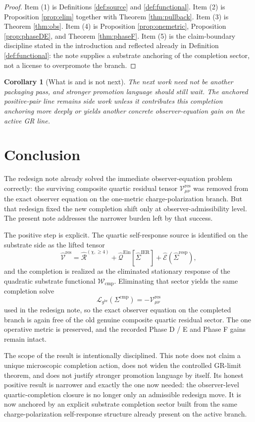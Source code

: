 \documentclass[11pt]{article}
\newcommand{\ObserverMetric}{g^{\mathrm{br}}}
\newcommand{\CompShift}{\Sigma^{\mathrm{cmp}}}
\newcommand{\BaseLift}{\widehat\Sigma^{\mathrm{IER}}}
\newcommand{\ResponseLift}{\widehat\Sigma^{\mathrm{resp}}}
\newcommand{\ResidualCore}{\mathcal V_{\mu\nu}^{\mathrm{res}}}
\newcommand{\ResidualLift}{\widehat{\mathcal V}^{\mathrm{res}}}
\newcommand{\CompFunctional}{\mathcal W_{\mathrm{cmp}}}
\newcommand{\ReducedEin}{\mathcal L_{\ObserverMetric}}
\newtheorem{corollary}{Corollary}
\begin{document}
\begin{proof}
Item (1) is Definitions \ref{def:source} and \ref{def:functional}. Item (2) is Proposition \ref{prop:elim} together with Theorem \ref{thm:pullback}. Item (3) is Theorem \ref{thm:obs}. Item (4) is Proposition \ref{prop:onemetric}, Proposition \ref{prop:phaseDE}, and Theorem \ref{thm:phaseF}. Item (5) is the claim-boundary discipline stated in the introduction and reflected already in Definition \ref{def:functional}: the note supplies a substrate anchoring of the completion sector, not a license to overpromote the branch.
\end{proof}

\begin{corollary}[What is and is not next]
The next work need not be another packaging pass, and stronger promotion language should still wait. The anchored positive-pair line remains side work unless it contributes this completion anchoring more deeply or yields another concrete observer-equation gain on the active GR line.
\end{corollary}

\section{Conclusion}

The redesign note already solved the immediate observer-equation problem correctly: the surviving composite quartic residual tensor \(\ResidualCore\) was removed from the exact observer equation on the one-metric charge-polarization branch. But that redesign fixed the new completion shift only at observer-admissibility level. The present note addresses the narrower burden left by that success.

The positive step is explicit. The quartic self-response source is identified on the substrate side as the lifted tensor
\[
\ResidualLift
=
\widehat{\mathcal R}^{(\chi,\ge 4)}
+\widehat{\mathcal Q}^{\mathrm{Ein}}[\BaseLift]
+\widehat{\mathcal E}(\ResponseLift),
\]
and the completion is realized as the eliminated stationary response of the quadratic substrate functional \(\CompFunctional\). Eliminating that sector yields the same completion solve
\[
\ReducedEin(\CompShift)=-\ResidualCore
\]
used in the redesign note, so the exact observer equation on the completed branch is again free of the old genuine composite quartic residual sector. The one operative metric is preserved, and the recorded Phase D / E and Phase F gains remain intact.

The scope of the result is intentionally disciplined. This note does not claim a unique microscopic completion action, does not widen the controlled GR-limit theorem, and does not justify stronger promotion language by itself. Its honest positive result is narrower and exactly the one now needed: the observer-level quartic-completion closure is no longer only an admissible redesign move. It is now anchored by an explicit substrate completion sector built from the same charge-polarization self-response structure already present on the active branch.
\end{document}
